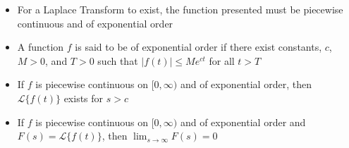 \documentclass[12pt]{article}
\begin{document}
\begin{itemize}
  \item For a Laplace Transform to exist, the function presented must be piecewise continuous and of exponential order

  \item A function $f$ is said to be of exponential order if there exist constants, $c$, $M>0$, and $T>0$ such that $|f(t)|\leq Me^{ct}$ for all $t>T$

  \item If $f$ is piecewise continuous on $[0,\infty)$ and of exponential order, then $\mathcal{L}\{f(t)\}$ exists for $s>c$

  \item If $f$ is piecewise continuous on $[0,\infty)$ and of exponential order and $F(s)=\mathcal{L}\{f(t)\}$, then $\lim_{s\to\infty}F(s)=0$

\end{itemize}
\end{document}
